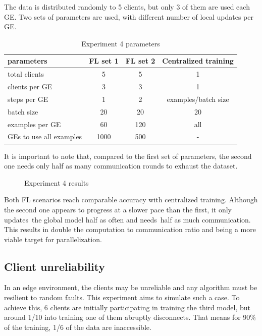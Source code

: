 The data is distributed randomly to 5 clients, but only 3 of them are used each GE. Two sets of parameters are used, with different number of local updates per GE.
    
\begin{table}[H]
    \center
    \begin{tabular}
        { | l | c | c | c | }
        \hline
        parameters & FL set 1 & FL set 2 & Centralized training\\\hline
        total clients & 5 & 5 & 1\\\hline
        clients per GE & 3 & 3 & 1\\\hline
        steps per GE & 1 & 2 & examples/batch size \\\hline
        batch size & 20  & 20  & 20 \\\hline
        examples per GE & 60  & 120  & all \\\hline
        GEs to use all examples & 1000  & 500  & - \\\hline
    \end{tabular}
    \caption[Experiment 4 parameters]{Experiment 4 parameters}
    \label{table:Experiment 4 parameters}
\end{table}

It is important to note that, compared to the first set of parameters, the second one needs only half as many communication rounds to exhaust the dataset.
    
\begin{figure}[H]
    \center
    
    \caption[Experiment 4 results]{Experiment 4 results}
    \label{fig:Experiment 4 results}
\end{figure}

Both FL scenarios reach comparable accuracy with centralized training. Although the second one appears to progress at a slower pace than the first, it only updates the global model half as often and needs half as much communication. This results in double the computation to communication ratio and being a more viable target for parallelization.

\subsection{Client unreliability}
In an edge environment, the clients may be unreliable and any algorithm must be resilient to random faults. This experiment aims to simulate such a case. To achieve this, 6 clients are initially participating in training the third model, but around 1/10 into training one of them abruptly disconnects. That means for 90\% of the training, 1/6 of the data are inaccessible.

